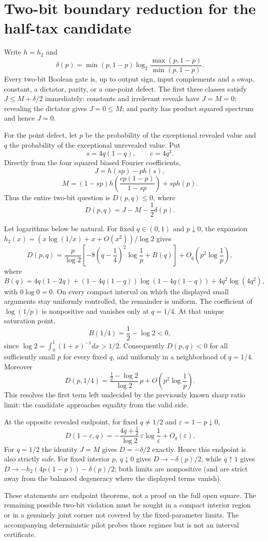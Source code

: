 \section*{Two-bit boundary reduction for the half-tax candidate}

Write $h=h_2$ and
\[
 \delta(p)=\min(p,1-p)\log_2\frac{\max(p,1-p)}{\min(p,1-p)}.
\]
Every two-bit Boolean gate is, up to output sign, input complements and a swap,
constant, a dictator, parity, or a one-point defect.  The first three classes
satisfy $J\le M+\delta/2$ immediately: constants and irrelevant reveals have
$J=M=0$; revealing the dictator gives $J=0\le M$; and parity has product
squared spectrum and hence $J=0$.

For the point defect, let $p$ be the probability of the exceptional revealed
value and $q$ the probability of the exceptional unrevealed value.  Put
\[
 s=4q(1-q),\qquad c=4q^2.
\]
Directly from the four squared biased Fourier coefficients,
\[
 J=h(sp)-p h(s),
\]
\[
 M=(1-sp)h\!\left(\frac{cp(1-p)}{1-sp}\right)+sp h(p).
\]
Thus the entire two-bit question is $D(p,q)\le0$, where
\[
 D(p,q)=J-M-\frac12\delta(p).
\]

Let logarithms below be natural.  For fixed $q\in(0,1)$ and $p\downarrow0$,
the expansion $h_2(x)=(x\log(1/x)+x+O(x^2))/\log2$ gives
\[
 D(p,q)=\frac p{\log2}\left[-8\left(q-\frac14\right)^2
 \log\frac1p+B(q)\right]+O_q\!\left(p^2\log\frac1p\right),
\]
where
\[
 B(q)=4q(1-2q)+(1-4q(1-q))\log(1-4q(1-q))
      +4q^2\log(4q^2),
\]
with $0\log0=0$.  On every compact interval on which the displayed small
arguments stay uniformly controlled, the remainder is uniform.  The
coefficient of $\log(1/p)$ is nonpositive and vanishes only at $q=1/4$.
At that unique saturation point,
\[
 B(1/4)=\frac12-\log2<0,
\]
since $\log2=\int_0^1(1+x)^{-1}dx>1/2$.  Consequently $D(p,q)<0$ for all
sufficiently small $p$ for every fixed $q$, and uniformly in a neighborhood
of $q=1/4$.  Moreover
\[
 D(p,1/4)=\frac{\frac12-\log2}{\log2}\,p
          +O\!\left(p^2\log\frac1p\right).
\]
This resolves the first term left undecided by the previously known sharp
ratio limit: the candidate approaches equality from the valid side.

At the opposite revealed endpoint, for fixed $q\ne1/2$ and
$\varepsilon=1-p\downarrow0$,
\[
 D(1-\varepsilon,q)
 =-\frac{4q+\frac12}{\log2}\,\varepsilon\log\frac1\varepsilon
   +O_q(\varepsilon).
\]
For $q=1/2$ the identity $J=M$ gives $D=-\delta/2$ exactly.  Hence this
endpoint is also strictly safe.  For fixed interior $p$, $q\downarrow0$ gives
$D\to-\delta(p)/2$, while $q\uparrow1$ gives
$D\to-h_2(4p(1-p))-\delta(p)/2$; both limits are nonpositive
(and are strict away from the balanced degeneracy where the displayed terms
vanish).

These statements are endpoint theorems, not a proof on the full open square.
The remaining possible two-bit violation must be sought in a compact interior
region or in a genuinely joint corner not covered by the fixed-parameter
limits.  The accompanying deterministic pilot probes those regimes but is not
an interval certificate.
